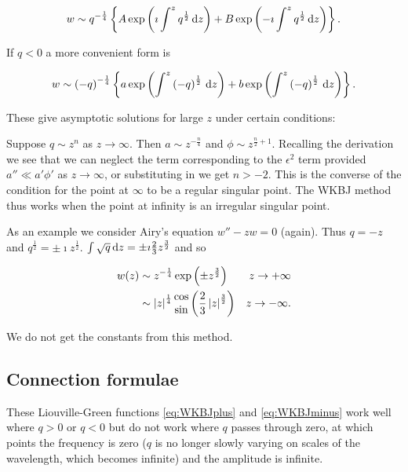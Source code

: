 \documentclass{notes}
\theoremstyle{plain}
\begin{document}
\begin{equation}\label{eq:WKBJplus}
w \sim q^{-\frac{1}{4}} \left\{
A \exp \left( \imath \int^z q^{\frac{1}{2}}\, \mathrm{d} z \right) +
B \exp \left( -\imath \int^z q^{\frac{1}{2}}\, \mathrm{d} z \right)
\right\}.
\end{equation}

If $q < 0$ a more convenient form is

\begin{equation}\label{eq:WKBJminus}
w \sim \left(-q\right)^{-\frac{1}{4}} \left\{
a \exp \left( \int^z \left(-q\right)^{\frac{1}{2}}\, \mathrm{d} z \right) +
b \exp \left( \int^z \left(-q\right)^{\frac{1}{2}}\, \mathrm{d} z \right) \right\}.
\end{equation}

These give asymptotic solutions for large $z$ under certain conditions:

Suppose $q \sim z^n$ as $z \to \infty$.  Then $a \sim z^{-\frac{n}{4}}$
and $\phi \sim z^{\frac{n}{2} + 1}$.  Recalling the derivation
we see that we can neglect the term corresponding to the $\epsilon^2$
term provided $a'' \ll a' \phi'$ as $z \to \infty$, or substituting in
we get $n > -2$.  This is the converse of the condition for the point
at $\infty$ to be a regular singular point.  The WKBJ method thus works
when the point at infinity is an irregular singular point.

As an example we consider Airy's equation $w'' - z w = 0$ (again).  Thus
$q = - z$ and $q^{\frac{1}{2}} = \pm \imath z^{\frac{1}{2}}$.
$\int \sqrt{q}\, \mathrm{d} z = \pm \imath \frac{2}{3} z^\frac{3}{2}$ and
so

\begin{align*}
w(z) &\sim z^{-\frac{1}{4}} \exp \left( \pm z^\frac{3}{2} \right) &
z \to +\infty \\
&\sim \left|z\right|^{\frac{1}{4}} \begin{matrix}\cos \\ \sin \end{matrix}
\left( \frac{2}{3} \left|z\right|^{\frac{3}{2}} \right) & z \to -\infty.
\end{align*}

We do not get the constants from this method.

\subsection{Connection formulae}

These Liouville-Green functions \eqref{eq:WKBJplus} and \eqref{eq:WKBJminus}
work well where $q > 0$ or $q < 0$ but do not work where $q$ passes through
zero, at which points the frequency is zero ($q$ is no longer slowly varying
on scales of the wavelength, which becomes infinite) and the amplitude is
infinite.
\end{document}
